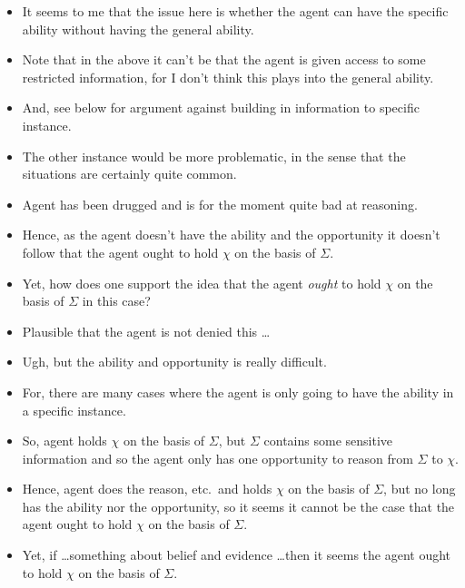 \documentclass[10pt]{article}
\begin{document}
\begin{itemize}
\item It seems to me that the issue here is whether the agent can have the specific ability without having the general ability.
\item Note that in the above it can't be that the agent is given access to some restricted information, for I don't think this plays into the general ability.
\item And, see below for argument against building in information to specific instance.
\end{itemize}

\begin{itemize}
\item The other instance would be  more problematic, in the sense that the situations are certainly quite common.
\item Agent has been drugged and is for the moment quite bad at reasoning.
\item Hence, as the agent doesn't have the ability and the opportunity it doesn't follow that the agent ought to hold \(\chi\) on the basis of \(\Sigma\).
\item Yet, how does one support the idea that the agent \emph{ought} to hold \(\chi\) on the basis of \(\Sigma\) in this case?
\item Plausible that the agent is not denied this \dots
\end{itemize}

\begin{itemize}
\item Ugh, but the ability and opportunity is really difficult.
\item For, there are many cases where the agent is only going to have the ability in a specific instance.
\item So, agent holds \(\chi\) on the basis of \(\Sigma\), but \(\Sigma\) contains some sensitive information and so the agent only has one opportunity to reason from \(\Sigma\) to \(\chi\).
\item Hence, agent does the reason, etc.\ and holds \(\chi\) on the basis of \(\Sigma\), but no long has the ability nor the opportunity, so it seems it cannot be the case that the agent ought to hold \(\chi\) on the basis of \(\Sigma\).
\item Yet, if \dots something about belief and evidence \dots then it seems the agent ought to hold \(\chi\) on the basis of \(\Sigma\).
\end{itemize}
\end{document}
